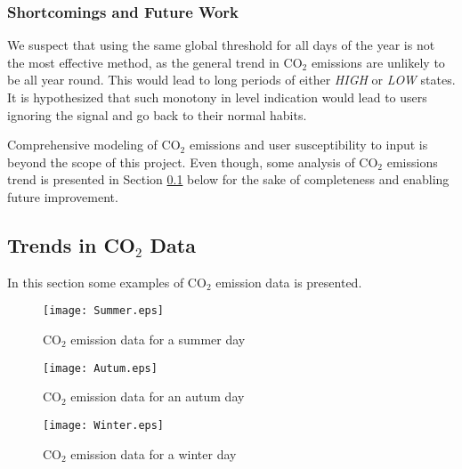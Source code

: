 \documentclass[Main]{subfiles}
\begin{document}
	\subsubsection{Shortcomings and Future Work} %
	\label{sub:shortcomings_and_future_work}
		We suspect that using the same global threshold for all days of the year is not the most effective method, as the general trend in CO$_2$ emissions are unlikely to be all year round.
		This would lead to long periods of either \emph{HIGH} or \emph{LOW} states.
		It is hypothesized that such monotony in level indication would lead to users ignoring the signal and go back to their normal habits.

		Comprehensive modeling of CO$_2$ emissions and user susceptibility to input is beyond the scope of this project.
		Even though, some analysis of CO$_2$ emissions trend is presented in Section \ref{sub:trends_in_co2_data} below for the sake of completeness and enabling future improvement.



	\subsection{Trends in CO$_2$ Data} %
	\label{sub:trends_in_co2_data}
		
		In this section some examples of CO$_2$ emission data is presented.

		\begin{figure}[H]
			\centering
			\caption{CO$_2$ emission data for a summer day} 
			\texttt{[image: Summer.eps]}
		\end{figure}


		\begin{figure}[H]
			\centering
			\caption{CO$_2$ emission data for an autum day} 
			\texttt{[image: Autum.eps]}
		\end{figure}


		\begin{figure}[H]
			\centering
			\caption{CO$_2$ emission data for a winter day} 
			\texttt{[image: Winter.eps]}
		\end{figure}

		

		
	


		
\end{document}
